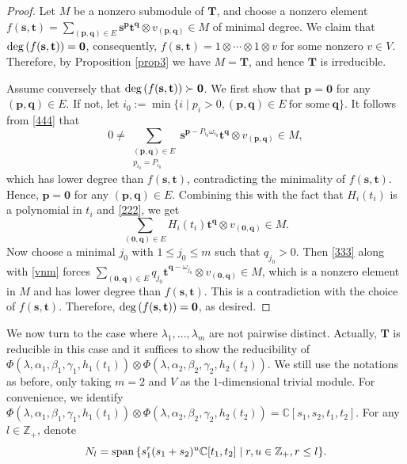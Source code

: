 \documentclass[12pt,leqno,amscd,amsfonts,amssymb]{amsart}
\def\a{\alpha}
\def\b{\beta}
\def\r{\gamma}
\def\Z{\mathbb{Z}}
\def\C{\mathbb{C}}
\numberwithin{equation}{section}
\begin{document}
\begin{proof}
Let $M$ be a nonzero submodule of $\bm{T}$, and choose a nonzero element $f(\mathbf{s}, \mathbf{t})=\sum_{(\mathbf{p}, \mathbf{q})\in E}\mathbf{s}^{\mathbf{p}}\mathbf{t}^{\mathbf{q}}\otimes v_{(\mathbf{p}, \mathbf{q})}\in M$ of minimal degree. We claim that ${\rm deg\,}(f(\mathbf{s}, \mathbf{t}))=\mathbf{0}$, consequently, $f(\mathbf{s}, \mathbf{t})=1\otimes\cdots \otimes 1\otimes v$ for some nonzero $v\in V$. Therefore, by Proposition \ref{prop3} we have $M=\bm{T}$, and hence $\bm{T}$ is irreducible.

Assume conversely that ${\rm deg\,}(f(\mathbf{s}, \mathbf{t}))\succ \mathbf{0}$.  We first show that $\mathbf{p}=\mathbf{0}$ for any $(\mathbf{p}, \mathbf{q})\in E$. If not, let $i_0:=\min\{i\mid p_i>0, (\mathbf{p}, \mathbf{q})\in E\ \text{for\ some}\ \mathbf{q}\}$. It follows from \eqref{444} that
$$0\neq\sum_{\substack{(\mathbf{p}, \mathbf{q})\in E \\ p_{i_0}=P_{i_0}}}\mathbf{s}^{\mathbf{p}-P_{i_0}\omega_{i_0}}\mathbf{t}^{\mathbf{q}}\otimes v_{(\mathbf{p}, \mathbf{q})}\in M,$$
which has lower degree than $f(\mathbf{s}, \mathbf{t})$, contradicting the minimality  of $f(\mathbf{s}, \mathbf{t})$. Hence, $\mathbf{p}=\mathbf{0}$ for any $(\mathbf{p}, \mathbf{q})\in E$. Combining this with the fact that $H_i(t_i)$ is a polynomial in $t_i$ and \eqref{222}, we get
\begin{equation}\label{vnm}\sum_{(\mathbf{0}, \mathbf{q})\in E}H_{i}(t_i)\mathbf{t}^{\mathbf{q}}\otimes v_{(\mathbf{0}, \mathbf{q})}\in M.\end{equation}
Now choose a minimal $j_0$ with $1\leq j_0\leq m$ such that $q_{j_0}>0$. Then \eqref{333} along with \eqref{vnm} forces $\sum_{(\mathbf{0}, \mathbf{q})\in E}q_{j_0}\mathbf{t}^{\mathbf{q}-\omega_{j_0}}\otimes v_{(\mathbf{0}, \mathbf{q})}\in M$, which is a nonzero element in $M$ and  has lower degree than $f(\mathbf{s}, \mathbf{t})$. This is a contradiction with the choice of $f(\mathbf{s}, \mathbf{t})$. Therefore, ${\rm deg\,}(f(\mathbf{s}, \mathbf{t}))=\mathbf{0}$, as desired.
\end{proof}
We now turn to the case where $\lambda_1, \ldots, \lambda_m$ are not pairwise distinct. Actually,  $\bm{T}$ is reducible in this case and it suffices to show the reducibility of $\Phi(\lambda,\a_1,\b_1,\r_1,h_1(t_1))\otimes\Phi(\lambda,\a_2,\b_2,\r_2,h_2(t_2))$. We still use the notations as before, only taking $m=2$ and $V$ as the $1$-dimensional trivial module. For convenience, we identify $\Phi(\lambda,\a_1,\b_1,\r_1,h_1(t_1))\otimes\Phi(\lambda,\a_2,\b_2,\r_2,h_2(t_2))=\C[s_1, s_2, t_1, t_2]$. For any $l\in\Z_+$, denote$$N_l={\rm span\,}\{s_1^r(s_1+s_2)^u\C[t_1, t_2]\mid r, u\in\Z_+, r\leq l\}.$$
\end{document}
